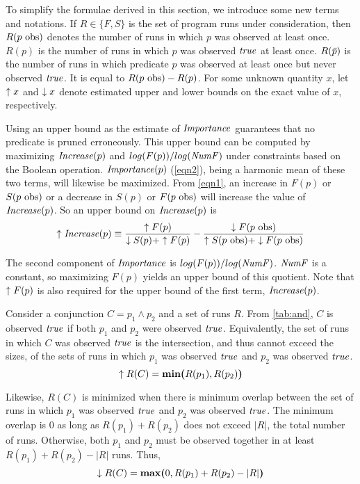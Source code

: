 To simplify the formulae derived in this section, we introduce some new terms and
notations.  If $R \in \{F, S\}$ is the set of program runs under consideration, then
$R(\text{$p$ obs})$ denotes the number of runs in which $p$ was observed at least
once.  $R(p)$ is the number of runs in which $p$ was observed $\mathit{true}$ at least once.
$R(\text{$\bar{p}$})$ is the number of runs in which predicate $p$ was observed
at least once but never observed $\mathit{true}$.  It is equal to $R(\text{$p$ obs}) - R(p)$.
For some unknown quantity $x$, let $\uparrow x$ and $\downarrow x$ denote estimated upper
and lower bounds on the exact value of $x$, respectively.

Using an upper bound as the estimate of $\mathit{Importance}$ guarantees that no
predicate is pruned erroneously.  This upper bound can be computed by maximizing
$\mathit{Increase}(p)$ and $log(F(p))/log(\mathit{NumF})$ under constraints based on the Boolean operation.
$\mathit{Importance}(p)$ (\autoref{eqn2}), being a harmonic mean of these two terms, will
likewise be maximized.  From \autoref{eqn1}, an increase in $F(p)$ or $S(\text{$p$ obs})$
or a decrease in $S(p)$ or $F(\text{$p$ obs})$ will increase the value of $\mathit{Increase}(p)$.
So an upper bound on $\mathit{Increase}(p)$ is
%
\begin{equation}
\label{eqn3}
\uparrow\mathit{Increase}(p) \equiv
\frac{\uparrow F(p)}{\downarrow S(p) + \uparrow F(p)}
-
\frac{\downarrow F(\text{$p$ obs})}{\uparrow S(\text{$p$ obs}) + \downarrow F(\text{$p$ obs})}
\end{equation}

The second component of $\mathit{Importance}$ is $log(F(p))/log(\mathit{NumF})$.  $\mathit{NumF}$
is a constant, so maximizing $F(p)$ yields an upper bound of this quotient.  Note that
$\uparrow F(p)$ is also required for the upper bound of the first term, $\mathit{Increase}(p)$.

Consider a conjunction $C = p_1 \wedge p_2$ and a set of runs $R$.  From \autoref{tab:and}, $C$ is
observed $\mathit{true}$ if both $p_1$ and $p_2$ were observed $\mathit{true}$.  Equivalently, the set
of runs in which $C$ was observed $\mathit{true}$ is the intersection,
and thus cannot exceed the sizes, of the sets of
runs in which $p_1$ was observed $\mathit{true}$ and $p_2$ was observed $\mathit{true}$.
\begin{equation*}
  \uparrow R(C) = \textbf{min(}R(p_1), R(p_2)\textbf{)}
\end{equation*}

Likewise, $R(C)$ is minimized when there is minimum overlap between the set
of runs in which $p_1$ was observed $\mathit{true}$ and $p_2$ was observed $\mathit{true}$.
The minimum overlap is $0$ as long as $R(p_1) + R(p_2)$ does not exceed $|R|$,
the total number of runs.  Otherwise, both $p_1$ and $p_2$ must be observed
together in at least $R(p_1) + R(p_2) - |R|$ runs.  Thus,
\begin{equation*}
  \downarrow R(C) = \textbf{max(}0, R(p_1) + R(p_2) - |R|\textbf{)}
\end{equation*}

